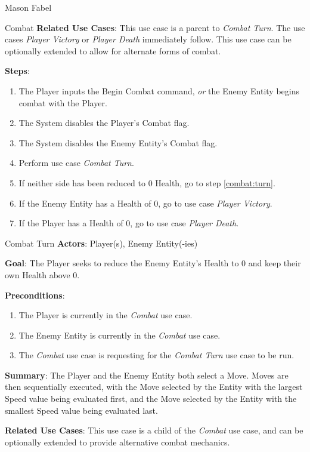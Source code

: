 \documentclass[12pt]{report}
\begin{document}
\begin{section}{Mason Fabel}
\begin{subsection}{Combat}
\textbf{Related Use Cases}:
This use case is a parent to \textit{Combat Turn}. The use cases
\textit{Player Victory} or \textit{Player Death} immediately follow. This
use case can be optionally extended to allow for alternate forms of combat.

\textbf{Steps}:
\begin{enumerate}
\item The Player inputs the Begin Combat command, \textit{or} the Enemy
Entity begins combat with the Player.
\item The System disables the Player's Combat flag.
\item The System disables the Enemy Entity's Combat flag.
\item \label{combat:turn} Perform use case \textit{Combat Turn}.
\item If neither side has been reduced to 0 Health,
	go to step \ref{combat:turn}.
\item If the Enemy Entity has a Health of 0, go to use case \textit{Player
	Victory}.
\item If the Player has a Health of 0, go to use case \textit{Player
	Death}.
\end{enumerate}
\end{subsection}

\begin{subsection}{Combat Turn}
\textbf{Actors}:
Player(s), Enemy Entity(-ies)

\textbf{Goal}:
The Player seeks to reduce the Enemy Entity's Health to 0 and keep their
own Health above 0.

\textbf{Preconditions}:
\begin{enumerate}
\item The Player is currently in the \textit{Combat} use case.
\item The Enemy Entity is currently in the \textit{Combat} use case.
\item The \textit{Combat} use case is requesting for the \textit{Combat
	Turn} use case to be run.
\end{enumerate}

\textbf{Summary}:
The Player and the Enemy Entity both select a Move. Moves are then
sequentially executed, with the Move selected by the Entity with the
largest Speed value being evaluated first, and the Move selected by the
Entity with the smallest Speed value being evaluated last.

\textbf{Related Use Cases}:
This use case is a child of the \textit{Combat} use case, and can be
optionally extended to provide alternative combat mechanics.


\end{subsection}
\end{section}
\end{document}
